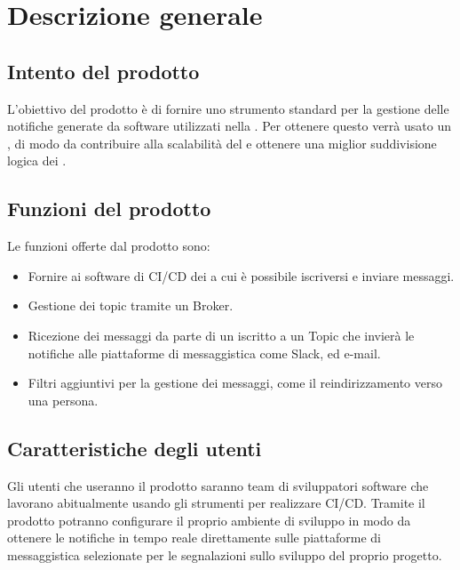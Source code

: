 \section{Descrizione generale}

	\subsection{Intento del prodotto}
    
    L'obiettivo del prodotto è di fornire uno strumento standard per la gestione delle notifiche generate da software utilizzati nella .
    Per ottenere questo verrà usato un , di modo da contribuire alla scalabilità del  e ottenere una miglior suddivisione logica dei .
	
	\subsection{Funzioni del prodotto}
	
    Le funzioni offerte dal prodotto sono:
    \begin{itemize}
		\item Fornire ai software di CI/CD dei  a cui è possibile iscriversi e inviare messaggi.
		\item Gestione dei topic tramite un Broker.
        \item Ricezione dei messaggi da parte di un  iscritto a un Topic che invierà le notifiche alle piattaforme di messaggistica come Slack,  ed e-mail.
        \item Filtri aggiuntivi per la gestione dei messaggi, come il reindirizzamento verso una persona.
	\end{itemize}

	\subsection{Caratteristiche degli utenti}
    
    Gli utenti che useranno il prodotto saranno team di sviluppatori software che lavorano abitualmente usando gli strumenti per realizzare CI/CD.
    Tramite il prodotto potranno configurare il proprio ambiente di sviluppo in modo da ottenere le notifiche in tempo reale direttamente sulle piattaforme di messaggistica selezionate per le segnalazioni sullo sviluppo del proprio progetto.
	

